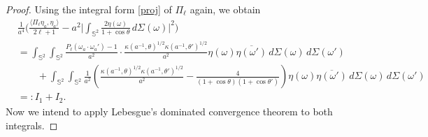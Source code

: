 \documentclass[a4paper,11pt,DIV=11,%
abstract=on%
]{scrartcl}
\begin{document}
\begin{proof}
	Using the integral form \eqref{proj} of $\Pi_\ell$ again, we obtain
	\begin{align}
		&\frac{1}{a^4}\Biggl(
		\frac{\langle\Pi_\ell\eta_a,\eta_a\rangle}{2\ell+1}
		-a^2\biggl|\int_{\mathbb
           S^2}\frac{2\eta(\omega)}{1+\cos\theta}\,d\Sigma(\omega)\biggr|^2\Biggr)
          \label{eq:12}\\
		&=\int_{\mathbb S^2}\int_{\mathbb S^2}
		\frac{P_{\ell} (\omega_a\cdot \omega_a')-1}{a^2}\cdot
		\frac{\kappa(a^{-1},\theta)^{1/2}\kappa(a^{-1},\theta')^{1/2}}{a^2}
		\eta(\omega) \overline{\eta(\omega')}\,d\Sigma(\omega)\,d\Sigma(\omega')\\
		&\qquad +\int_{\mathbb S^2}\int_{\mathbb S^2}
		\frac{1}{a^2}\left(\frac{\kappa(a^{-1},\theta)^{1/2}\kappa(a^{-1},\theta')^{1/2}}{a^2}
		-\frac{4}{(1+\cos\theta) (1+\cos\theta')}\right)
		\eta(\omega)\overline{\eta(\omega')}\,d\Sigma(\omega)\,
           d\Sigma(\omega') \nonumber\\ 
		&=: I_1+I_2.\nonumber
	\end{align}
	Now we intend to apply Lebesgue's dominated convergence theorem to both integrals.
	

\end{proof}
\end{document}
